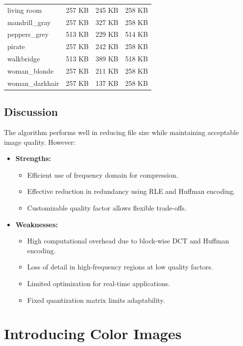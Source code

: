 \documentclass{article}
\begin{document}
\begin{table}[!htb]
\begin{tabular}{llll}
   living room &              257 KB &          245 KB &         258 KB \\
 mandrill\_gray &              257 KB &          327 KB &         258 KB \\
  peppers\_grey &              513 KB &          229 KB &         514 KB \\
        pirate &              257 KB &          242 KB &         258 KB \\
    walkbridge &              513 KB &          389 KB &         518 KB \\
  woman\_blonde &              257 KB &          211 KB &         258 KB \\
woman\_darkhair &              257 KB &          137 KB &         258 KB \\
\bottomrule
\end{tabular}
\end{table}

\subsection{Discussion}
The algorithm performs well in reducing file size while maintaining acceptable image quality. However:
\begin{itemize}
    \item \textbf{Strengths:} 
    \begin{itemize}
        \item Efficient use of frequency domain for compression.
        \item Effective reduction in redundancy using RLE and Huffman encoding.
        \item Customizable quality factor allows flexible trade-offs.
    \end{itemize}
    \item \textbf{Weaknesses:}
    \begin{itemize}
        \item High computational overhead due to block-wise DCT and Huffman encoding.
        \item Loss of detail in high-frequency regions at low quality factors.
        \item Limited optimization for real-time applications.
        \item Fixed quantization matrix limits adaptability.
    \end{itemize}
\end{itemize}

\newpage
\section{Introducing Color Images}
\end{document}
